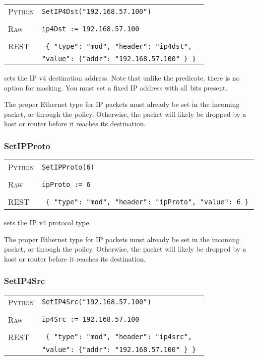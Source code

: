 \bigskip
\begin{tabularx}{\linewidth}{lX}
\textsc{Python}   & \texttt{SetIP4Dst("192.168.57.100")} \\ \\
\textsc{Raw}    & \texttt{ip4Dst := 192.168.57.100}     \\ \\
\textsc{REST} & \texttt{ \{ "type": "mod", "header": "ip4dst", } \\
  & \texttt{"value": \{"addr": "192.168.57.100" \} \} }
\end{tabularx}

 sets the IP v4 destination address.  Note that unlike the  predicate,
there is no option for masking.  You must set a fixed IP address with all bits present.    

The proper Ethernet type for IP packets must already be set in the incoming packet, or through the 
 policy.  Otherwise, the packet will likely be dropped by a host or router before it 
reaches its destination.

\subsubsection{SetIPProto}

\bigskip
\begin{tabularx}{\linewidth}{lX}
\textsc{Python}   & \texttt{SetIPProto(6)} \\ \\
\textsc{Raw}    & \texttt{ipProto := 6}     \\ \\
\textsc{REST} & \texttt{ \{ "type": "mod", "header": "ipProto", "value": 6 \} }
\end{tabularx}

 sets the IP v4 protocol type.      

The proper Ethernet type for IP packets must already be set in the incoming packet, or through the 
 policy.  Otherwise, the packet will likely be dropped by a host or router before it 
reaches its destination.

\subsubsection{SetIP4Src}

\bigskip
\begin{tabularx}{\linewidth}{lX}
\textsc{Python}   & \texttt{SetIP4Src("192.168.57.100")} \\ \\
\textsc{Raw}    & \texttt{ip4Src := 192.168.57.100}     \\ \\
\textsc{REST} & \texttt{ \{ "type": "mod", "header": "ip4src", } \\
  & \texttt{"value": \{"addr": "192.168.57.100" \} \} }
\end{tabularx}

